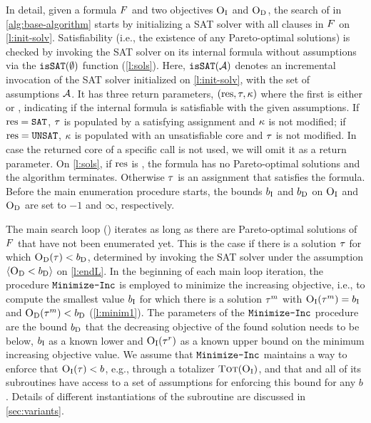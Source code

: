In detail, given a formula $F$ and two objectives $\textsc{O}_{\text{I}}$ and $\textsc{O}_{\text{D}}$, the search of \algname{} in \cref{alg:base-algorithm} starts by initializing a SAT solver with all clauses in $F$ on \cref{l:init-solv}.
Satisfiability (i.e., the existence of any Pareto-optimal solutions) is checked by invoking the SAT solver on its internal formula without assumptions via the $\texttt{isSAT}(\emptyset)$ function (\cref{l:sols}).
Here, $\texttt{isSAT}(\mathcal{A})$ denotes an incremental invocation of the SAT solver initialized on \cref{l:init-solv}, with the set of assumptions $\mathcal{A}$.
It has three return parameters, $(\text{res},\tau,\kappa)$ where the first is either \sat{} or \unsat{}, indicating if the internal formula is satisfiable with the given assumptions.
If $\text{res}=\texttt{SAT}$, $\tau$ is populated by a satisfying assignment and $\kappa$ is not modified;
if $\text{res}=\texttt{UNSAT}$, $\kappa$ is populated with an unsatisfiable core and $\tau$ is not modified.
In case the returned core of a specific call is not used, we will omit it as a return parameter.
On \cref{l:sols}, if $\text{res}$ is \unsat{}, the formula has no Pareto-optimal solutions and the algorithm terminates.
Otherwise $\tau$ is an assignment that satisfies the formula.
Before the main enumeration procedure starts, the bounds $b_{\text{I}}$ and $b_{\text{D}}$ on $\textsc{O}_{\text{I}}$ and $\textsc{O}_{\text{D}}$ are set to $-1$ and $\infty$, respectively.

The main search loop () iterates as long as there are Pareto-optimal solutions of $F$ that have not been enumerated yet. 
This is the case if there is a solution $\tau$ for which $\textsc{O}_{\text{D}}(\tau) < b_{\text{D}}$, determined by invoking the SAT solver under the assumption $\langle \textsc{O}_{\text{D}} < b_{\text{D}} \rangle$ on \cref{l:endL}.
In the beginning of each main loop iteration, the procedure $\texttt{Minimize-\allowbreak{}Inc}$ is employed to minimize the increasing objective, i.e., to compute the smallest value $b_{\text{I}}$ for which there is a solution $\tau^m$ with $\textsc{O}_{\text{I}}(\tau^m) = b_{\text{I}}$ and $\textsc{O}_{\text{D}}(\tau^m) < b_{\text{D}}$ (\cref{l:minim1}). 
The parameters of the $\texttt{Minimize-\allowbreak{}Inc}$ procedure are the bound $b_{\text{D}}$ that the decreasing objective of the found solution needs to be below, $b_{\text{I}}$ as a known lower and $\textsc{O}_{\text{I}}(\tau^r)$ as a known upper bound on the minimum increasing objective value.
We assume that $\texttt{Minimize-\allowbreak{}Inc}$ maintains a way to enforce that $\textsc{O}_{\text{I}}(\tau) < b$, e.g., through a totalizer $\textsc{Tot}(\textsc{O}_{\text{I}})$, and that \algname{} and all of its subroutines have access to a set of assumptions for enforcing this bound for any $b$.
Details of different instantiations of the \Min{} subroutine are discussed in \cref{sec:variants}.

